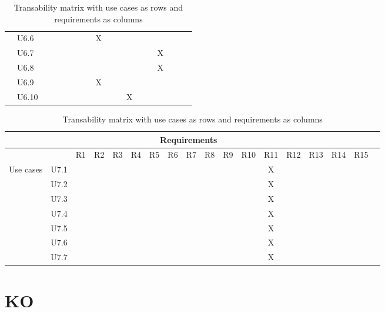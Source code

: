 \documentclass[hidelinks, 12pt, a4paper]{article}
\begin{document}
\begin{table}[H]
\begin{tabular}{|l|l|l|c|c|c|c|c|c|c|c|c|c|c|c|c|c|c|}
        & U6.6 &    &       &      &   &   &   &  X &   &   &   &   &   &   &    &  \\ \cline{2-17}    
        & U6.7 &    &       &      &   &   &   &   &   &   &   &   &   & X  &    &  \\ \cline{2-17}    
        & U6.8 &    &       &      &   &   &   &   &   &   &   &   &   & X  &    &  \\ \cline{2-17}    
        & U6.9 &    &       &      &   &   &   & X  &   &   &   &   &   &   &    &  \\ \cline{2-17}    
        & U6.10 &   &       &      &   &   &   &   &   &   & X  &   &   &   &    &  \\ \cline{1-17}    
  

   \end{tabular}
   \vspace{0.2cm}
    \caption{Transability matrix with use cases as rows and requirements as columns}
    \label{table:ContinuedCould-haveRequirementsTraceabilityMatrix}
\end{table}
\newpage
\begin{table}[H]
    \centering
        \begin{tabular}{|l|l|l|c|c|c|c|c|c|c|c|c|c|c|c|c|c|c|}
        \hline
    
            \multicolumn{17}{|c|}{Requirements} \\ \hline
            &  & R1  & R2   & R3 & R4 & R5 & R6 & R7 &R8 & R9 & R10 & R11 & R12 & R13 & R14 & R15    \\ \hline
        \multirow{7}{*}{Use cases}
        
        & U7.1 &    &       &      &   &   &   &   &   &   &   & X  &   &   &    &  \\ \cline{2-17}    
        & U7.2 &    &       &      &   &   &   &   &   &   &   & X  &   &   &    &  \\ \cline{2-17}    
        & U7.3 &    &       &      &   &   &   &   &   &   &   & X  &   &   &    &  \\ \cline{2-17}    
        & U7.4 &    &       &      &   &   &   &   &   &   &   & X  &   &   &    &  \\ \cline{2-17}    
        & U7.5 &    &       &      &   &   &   &   &   &   &   & X  &   &   &    &  \\ \cline{2-17}    
        & U7.6 &    &       &      &   &   &   &   &   &   &   & X  &   &   &    &  \\ \cline{2-17}    
        & U7.7 &    &       &      &   &   &   &   &   &   &   & X  &   &   &    &  \\ \cline{1-17}    
        
   \end{tabular}
   \vspace{1cm}
    \caption{Transability matrix with use cases as rows and requirements as columns}
    \label{table:ContinuedCould-haveRequirementsTraceabilityMatrix}
\end{table}

\newpage
\section{KO}

    
\end{document}
